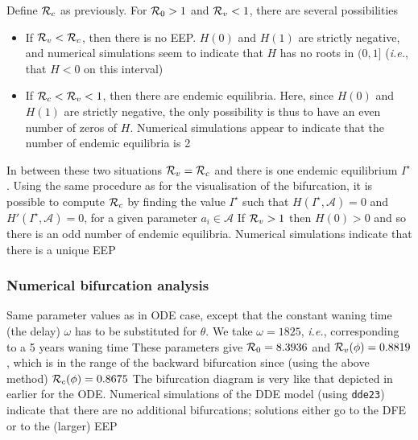 \documentclass[aspectratio=169]{beamer}\usepackage[]{graphicx}\usepackage[]{xcolor}
\begin{document}
\begin{frame}
Define $\mathcal{R}_c$ as previously. For $\mathcal{R}_0>1$ and
$\mathcal{R}_v<1$, there are several possibilities
\begin{itemize}
\item If $\mathcal{R}_v<\mathcal{R}_c$, then there is no EEP. $H(0)$ and $H(1)$
 are strictly negative, and numerical simulations seem to indicate that $H$ has no roots in $(0,1]$ (\emph{i.e.}, that $H<0$ on this interval)
\item If $\mathcal{R}_c<\mathcal{R}_v<1$, then there are endemic equilibria.
 Here, since $H(0)$ and $H(1)$ are strictly negative, the only possibility is thus to have an even number of zeros of $H$. Numerical simulations appear to indicate that the number of endemic equilibria is 2
\end{itemize}
In between these two situations $\mathcal{R}_v=\mathcal{R}_c$ and there is one endemic equilibrium $I^\star$. Using the same procedure as for the visualisation of the bifurcation, it is possible to compute $\mathcal{R}_c$ by finding the value $I^\star$ such that
$H(I^\star,\mathcal{A})=0$ and $H'(I^\star,\mathcal{A})=0$, for a given parameter $a_i\in\mathcal{A}$
\vfill
If $\mathcal{R}_v>1$ then $H(0)>0$ and so there is an odd number of endemic equilibria. Numerical simulations indicate that there is a unique EEP
\end{frame}

\begin{frame}\frametitle{Numerical bifurcation analysis}
Same parameter values as in ODE case, except that the
constant waning time (the delay) $\omega$ has to be substituted for $\theta$. We take $\omega=1825$, \emph{i.e.}, corresponding to a 5 years waning time
\vfill
These parameters give $\mathcal{R}_0=8.3936$ and $\mathcal{R}_v(\phi)=0.8819$, which is in the range of the backward bifurcation since (using the above method) $\mathcal{R}_c(\phi)=0.8675$
\vfill
The bifurcation diagram is very like that depicted in earlier for the ODE. Numerical simulations of the DDE model (using {\tt dde23}) indicate that there are no additional bifurcations; solutions either go to the DFE or to the (larger) EEP
\end{frame}
\end{document}
